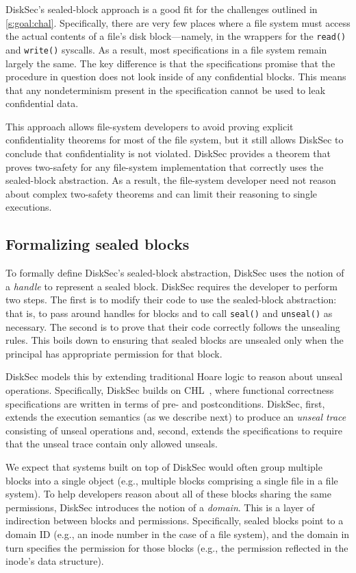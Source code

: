 DiskSec's sealed-block approach is a good fit for the challenges outlined in
\ref{s:goal:chal}.  Specifically, there are very few places where a file
system must access the actual contents of a file's disk block---namely, in the
wrappers for the \texttt{read()} and \texttt{write()} syscalls.  As a result, most
specifications in a file system remain largely the same.  The key difference is
that the specifications promise that the procedure in question does not look
inside of any confidential blocks.  This means that any nondeterminism present
in the specification cannot be used to leak confidential data.

This approach allows file-system developers to avoid proving explicit
confidentiality theorems for most of the file system, but it still allows
DiskSec to conclude that confidentiality is not violated.  DiskSec provides a
theorem that proves two-safety for any file-system implementation that
correctly uses the sealed-block abstraction.  As a result, the
file-system developer need not reason about complex two-safety theorems
and can limit their reasoning to single executions.


\subsection{Formalizing sealed blocks}

To formally define DiskSec's sealed-block abstraction, DiskSec uses the
notion of a \emph{handle} to represent a sealed block.  DiskSec requires
the developer to perform two steps.  The first is to modify their code
to use the sealed-block abstraction: that is, to pass around handles
for blocks and to call \texttt{seal()} and \texttt{unseal()} as necessary.
The second is to prove that their code correctly follows the unsealing
rules.  This boils down to ensuring that sealed blocks are unsealed only
when the principal has appropriate permission for that block.

DiskSec models this by extending traditional Hoare logic to reason about
unseal operations.  Specifically, DiskSec builds on CHL~\cite{chen:fscq},
where functional correctness specifications are written in terms of
pre- and postconditions.  DiskSec, first, extends the execution semantics
(as we describe next) to produce an \emph{unseal trace} consisting of
unseal operations and, second, extends the specifications to require
that the unseal trace contain only allowed unseals.

We expect that systems built on top of DiskSec would often group multiple
blocks into a single object (e.g., multiple blocks comprising a single
file in a file system).  To help developers reason about all of these
blocks sharing the same permissions, DiskSec introduces the notion of
a \emph{domain}.  This is a layer of indirection between blocks and
permissions.  Specifically, sealed blocks point to a domain ID (e.g.,
an inode number in the case of a file system), and the domain in turn
specifies the permission for those blocks (e.g., the permission reflected
in the inode's data structure).



